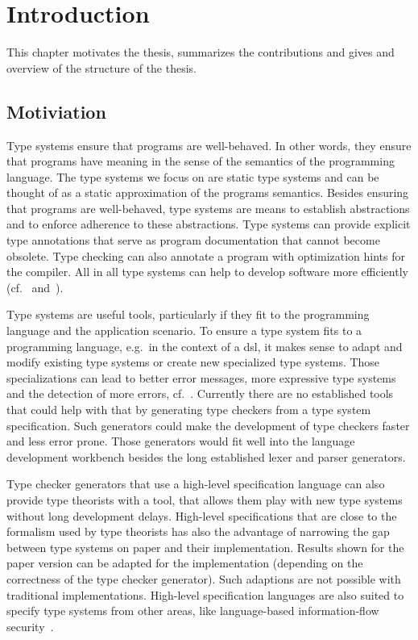 \chapter{Introduction}
This chapter motivates the thesis, summarizes the contributions and
gives and overview of the structure of the thesis.

\section{Motiviation}
Type systems ensure that programs are well-behaved. In other words,
they ensure that programs have meaning in the sense of the semantics
of the programming language. The type systems we focus on are static
type systems and can be thought of as a static approximation of the
programs semantics. Besides ensuring that programs are well-behaved,
type systems are means to establish abstractions and to enforce
adherence to these abstractions. Type systems can provide explicit
type annotations that serve as program documentation that cannot
become obsolete. Type checking can also annotate a program with
optimization hints for the compiler. All in all type systems can help
to develop software more efficiently
(cf.~\cite{Petersen:2014:ECS:2597008.2597152}
and~\cite{Mayer:2012:ESI:2384616.2384666}).

Type systems are useful tools, particularly if they fit to the
programming language and the application scenario. To ensure a type
system fits to a programming language, e.g.\ in the context of a
\gls{dsl}, it makes sense to adapt and modify existing type systems or
create new specialized type systems. Those specializations can lead to
better error messages, more expressive type systems and the detection
of more errors, cf.~\cite{Thiemann02programmabletype}. Currently there
are no established tools that could help with that by generating type
checkers from a type system specification. Such generators could make
the development of type checkers faster and less error prone. Those
generators would fit well into the language development workbench
besides the long established lexer and parser generators.

Type checker generators that use a high-level specification language
can also provide type theorists with a tool, that allows them play
with new type systems without long development delays. High-level
specifications that are close to the formalism used by type theorists
has also the advantage of narrowing the gap between type systems on
paper and their implementation. Results shown for the paper version
can be adapted for the implementation (depending on the correctness of
the type checker generator). Such adaptions are not possible with
traditional implementations. High-level specification languages are
also suited to specify type systems from other areas, like
language-based information-flow
security~\cite{Sabelfeld:2006:LIS:2312191.2314769}.

